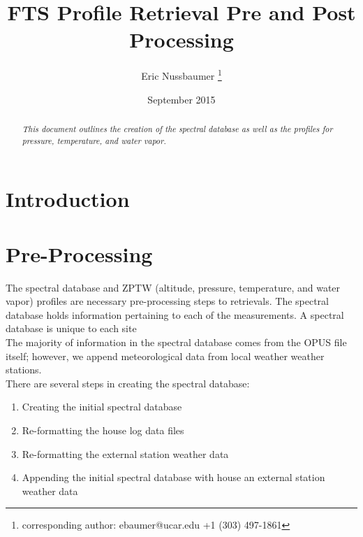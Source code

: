 \documentclass[12pt, letterpaper]{article}
\title{FTS Profile Retrieval Pre and Post Processing}
\author[1]{Eric Nussbaumer \thanks{corresponding author: ebaumer@ucar.edu +1 (303) 497-1861}}
\affil[1]{National Center for Atmospheric Research, Boulder, CO, USA}
\date{September 2015}
\begin{document}
\begin{titlepage}

\maketitle
\thispagestyle{empty}
\pagestyle{empty}

\begin{abstract}
  \begin{adjustwidth}{2em}{2em} 
    \large{
      \emph{
This document outlines the creation of the spectral database as well as the profiles for pressure, temperature, and water vapor.
}}
      
  \end{adjustwidth}

\end{abstract}

\end{titlepage}
 
\newpage
\tableofcontents
\newpage


\section{Introduction} 
\label{sec:intro}

\section{Pre-Processing}
The spectral database and ZPTW (altitude, pressure, temperature, and water vapor) profiles are necessary pre-processing steps to retrievals. The spectral database holds information pertaining to each of the measurements. A spectral database is unique to each site\\

The majority of information in the spectral database comes from the OPUS file itself; however, we append meteorological data from local weather weather stations.\\

There are several steps in creating the spectral database:\\

\begin{enumerate}
\item Creating the initial spectral database
\item Re-formatting the house log data files
\item Re-formatting the external station weather data
\item Appending the initial spectral database with house an external station weather data
\end{enumerate}
\end{document}
